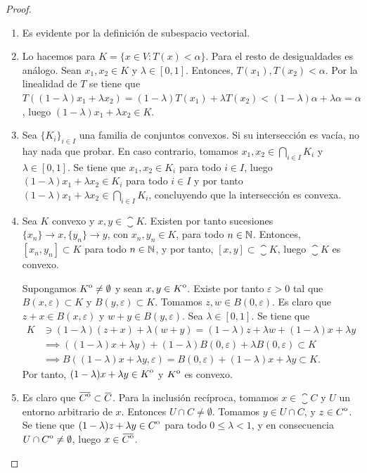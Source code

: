 \begin{proof}~
    \begin{enumerate}
        \item Es evidente por la definición de subespacio vectorial.
        \item Lo hacemos para $K = \{x \in V \colon T(x) < \alpha\}$. Para el resto de desigualdades es análogo. Sean $x_1,x_2 \in K$ y $\lambda \in [0,1]$. Entonces, $T(x_1),T(x_2) < \alpha$. Por la linealidad de $T$ se tiene que $T((1-\lambda)x_1+\lambda x_2) = (1-\lambda)T(x_1) + \lambda T(x_2) < (1-\lambda)\alpha + \lambda\alpha = \alpha$, luego $(1-\lambda)x_1+\lambda x_2 \in K$.

        \item Sea $\{K_i\}_{i\in I}$ una familia de conjuntos convexos. Si su intersección es vacía, no hay nada que probar. En caso contrario, tomamos $x_1,x_2 \in \bigcap_{i \in I}K_i$ y $\lambda \in [0,1]$. Se tiene que $x_1,x_2 \in K_i$ para todo $i \in I$, luego $(1-\lambda)x_1 + \lambda x_2 \in K_i$ para todo $i \in I$ y por tanto $(1-\lambda)x_1 + \lambda x_2 \in \bigcap_{i\in I}K_i$, concluyendo que la intersección es convexa.

        \item Sea $K$ convexo y $x,y \in \closure{K}$. Existen por tanto sucesiones $\{x_n\} \to x, \{y_n\} \to y$, con $x_n,y_n \in K$, para todo $n \in \mathbb{N}$. Entonces, $[x_n,y_n] \subset K$ para todo $n \in \mathbb{N}$, y por tanto, $[x,y] \subset \closure{K}$, luego $\closure{K}$ es convexo.

        Supongamos ${\kern0ptK}^{\mathrm{o}} \ne \emptyset$ y sean $x,y \in {\kern0ptK}^{\mathrm{o}}$. Existe por tanto $\varepsilon > 0$ tal que $B(x,\varepsilon) \subset K$ y $B(y,\varepsilon) \subset K$. Tomamos $z,w \in B(0,\varepsilon)$. Es claro que $z+x \in B(x,\varepsilon)$ y $w+y \in B(y,\varepsilon)$. Sea $\lambda \in [0,1]$. Se tiene que
        \begin{align*}
            K &\ni (1-\lambda)(z+x)+\lambda(w+y) = (1-\lambda)z+\lambda w + (1-\lambda)x+\lambda y \\
            &\implies ((1-\lambda)x+\lambda y) + (1-\lambda)B(0,\varepsilon)+\lambda B(0,\varepsilon) \subset K \\
            &\implies B((1-\lambda)x+\lambda y,\varepsilon) = B(0,\varepsilon) + (1-\lambda)x+\lambda y \subset K.
        \end{align*}
        Por tanto, $(1-\lambda)x+\lambda y \in {\kern0ptK}^{\mathrm{o}}$ y ${\kern0ptK}^{\mathrm{o}}$ es convexo.

        \item Es claro que $\closure{\interior{C}} \subset \closure{C}$. Para la inclusión recíproca, tomamos $x \in \closure{C}$ y $U$ un entorno arbitrario de $x$. Entonces $U \cap C \ne \emptyset$. Tomamos $y \in U\cap C$, y $z \in {\kern0ptC}^{\mathrm{o}}$. Se tiene que $(1-\lambda)z + \lambda y \in {\kern0ptC}^{\mathrm{o}}$ para todo $0 \le \lambda < 1$, y en consecuencia $U \cap {\kern0ptC}^{\mathrm{o}} \ne \emptyset$, luego $x \in \closure{\interior{C}}$.


\end{enumerate}
\end{proof}
